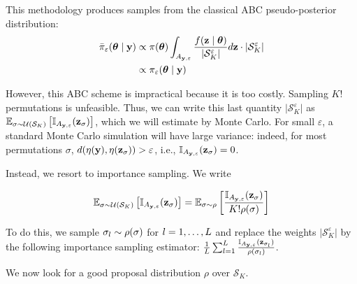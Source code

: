This methodology produces samples from the classical ABC pseudo-posterior distribution:
\begin{equation}
    \begin{split}
        \bar \pi_{\varepsilon} (\boldsymbol{\theta} \mid \mathbf{y}) & \propto \pi(\boldsymbol{\theta}) \int_{A_{\mathbf{y},\varepsilon}} \frac{f(\mathbf{z} \mid \boldsymbol{\theta})}{\lvert \mathcal S_K^\varepsilon \rvert} d\mathbf{z} \cdot \lvert \mathcal S_K^\varepsilon \rvert\\
        & \propto \pi_{\varepsilon} (\boldsymbol{\theta} \mid \mathbf{y})
    \end{split}
\end{equation}


However, this ABC scheme is impractical because it is too costly. Sampling $K!$ permutations is unfeasible. Thus, we can write this last quantity $\lvert \mathcal S_K^\varepsilon \rvert$ as $\mathbb{E}_{\sigma \sim \mathcal{U}(\mathcal{S}_K)}\left[\mathbb{I}_{A_{\mathbf{y},\varepsilon}}(\mathbf{z}_{\sigma})\right]$, which we will estimate by Monte Carlo. For small $\varepsilon$, a standard Monte Carlo simulation will have large variance: indeed, for most permutations $\sigma$, $d(\eta(\mathbf{y}), \eta(\mathbf{z}_{\sigma})) > \varepsilon$, i.e., $\mathbb{I}_{A_{\mathbf{y},\varepsilon}}(\mathbf{z}_{\sigma})=0$. 

Instead, we resort to importance sampling. We write

\[\mathbb{E}_{\sigma \sim \mathcal{U}(\mathcal{S}_K)}\left[\mathbb{I}_{A_{\mathbf{y},\varepsilon}}(\mathbf{z}_{\sigma})\right] = 
\mathbb{E}_{\sigma \sim \rho}\left[\frac{\mathbb{I}_{A_{\mathbf{y},\varepsilon}}(\mathbf{z}_{\sigma})}{K!\rho(\sigma)}\right]\]

To do this, we sample $\sigma_{l} \sim \rho(\sigma)$ for $l=1,\dots, L$ and replace the weights $\lvert \mathcal S_K^\varepsilon \rvert$ by the following importance sampling estimator: $\frac{1}{L}\sum_{l=1}^L \frac{\mathbb{I}_{A_{\mathbf{y},\varepsilon}}(\mathbf{z}_{\sigma_{l}})}{\rho(\sigma_{l})}$. 



We now look for a good proposal distribution $\rho$ over $\mathcal{S}_K$.

